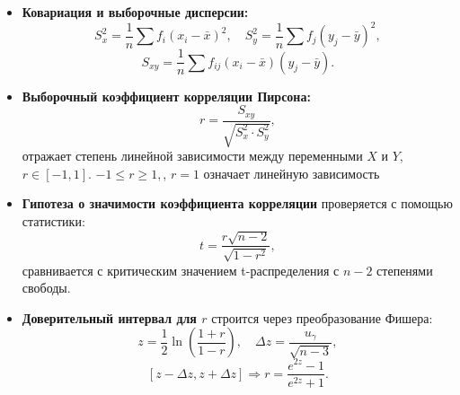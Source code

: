 \documentclass[a4paper,11pt]{article}
\newenvironment{shdd}{\begin{mdframed}[backgroundcolor=shadecolor]}{\end{mdframed}}
\theoremstyle{definition}
\begin{document}
\begin{shdd}
\begin{itemize}
            \item \textbf{Ковариация и выборочные дисперсии:}
            \[
            S_x^2 = \frac{1}{n} \sum f_i (x_i - \bar{x})^2, \quad
            S_y^2 = \frac{1}{n} \sum f_j (y_j - \bar{y})^2,
            \]
            \[
            S_{xy} = \frac{1}{n} \sum f_{ij}(x_i - \bar{x})(y_j - \bar{y}).
            \]

            \item \textbf{Выборочный коэффициент корреляции Пирсона:}
            \[
            r = \frac{S_{xy}}{\sqrt{S_x^2 \cdot S_y^2}},
            \]
            отражает степень линейной зависимости между переменными \(X\) и \(Y\), \(r \in [-1, 1]\).
            \(-1 \leq r \geq 1,\), \(r = 1\) означает линейную зависимость

            \item \textbf{Гипотеза о значимости коэффициента корреляции} проверяется с помощью статистики:
            \[
            t = \frac{r \sqrt{n - 2}}{\sqrt{1 - r^2}},
            \]
            сравнивается с критическим значением t-распределения с \(n - 2\) степенями свободы.

            \item \textbf{Доверительный интервал для \(r\)} строится через преобразование Фишера:
            \[
            z = \frac{1}{2} \ln\left( \frac{1 + r}{1 - r} \right), \quad
            \Delta z = \frac{u_{\gamma}}{\sqrt{n - 3}},
            \]
            \[
            [z - \Delta z, z + \Delta z] \Rightarrow r = \frac{e^{2z} - 1}{e^{2z} + 1}.
            \]
        \end{itemize}

    \end{shdd}
    \vspace{10pt}
\end{document}
